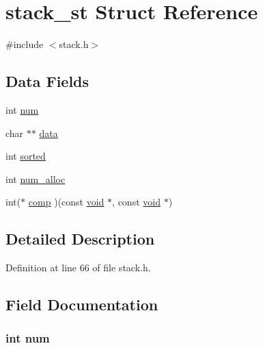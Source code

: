 \hypertarget{structstack__st}{}\section{stack\+\_\+st Struct Reference}
\label{structstack__st}


{\ttfamily \#include $<$stack.\+h$>$}

\subsection*{Data Fields}
\begin{DoxyCompactItemize}
\item 
int \hyperlink{structstack__st_a86cf672daa4e0ad11ad10efc894d19c8}{num}
\item 
char $\ast$$\ast$ \hyperlink{structstack__st_a4abb3a814e075556aea26c8a8e63ea79}{data}
\item 
int \hyperlink{structstack__st_a96871ce32e4123693134ec578d5462ff}{sorted}
\item 
int \hyperlink{structstack__st_a335194b9069e65772ac2fccb468e271c}{num\+\_\+alloc}
\item 
int($\ast$ \hyperlink{structstack__st_a07255e7a23fa92d3bc16c5560e317153}{comp} )(const \hyperlink{hw__4758__cca_8h_afad4d591c7931ff6dc5bf69c76c96aa0}{void} $\ast$, const \hyperlink{hw__4758__cca_8h_afad4d591c7931ff6dc5bf69c76c96aa0}{void} $\ast$)
\end{DoxyCompactItemize}


\subsection{Detailed Description}


Definition at line 66 of file stack.\+h.



\subsection{Field Documentation}
\subsubsection[{\texorpdfstring{num}{num}}]{\setlength{\rightskip}{0pt plus 5cm}int num}\hypertarget{structstack__st_a86cf672daa4e0ad11ad10efc894d19c8}{}\label{structstack__st_a86cf672daa4e0ad11ad10efc894d19c8}


